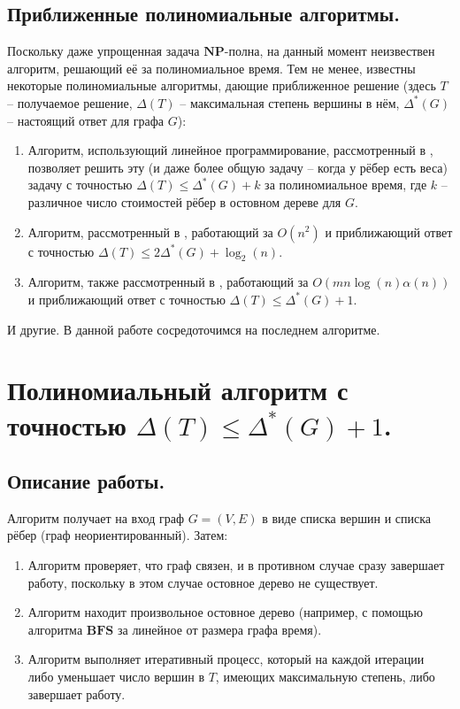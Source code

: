 \documentclass[a4paper,11pt]{article}
\renewcommand{\le}{\ensuremath{\leqslant}}
\theoremstyle{plain}
\theoremstyle{definition}
\theoremstyle{remark}
\begin{document}
\subsection{Приближенные полиномиальные алгоритмы.}

Поскольку даже упрощенная задача $\mathbf{NP}$-полна, на данный момент неизвествен алгоритм, решающий её за полиномиальное время. Тем не менее, известны некоторые полиномиальные алгоритмы, дающие приближенное решение (здесь $T$ -- получаемое решение, $\Delta(T)$ -- максимальная степень вершины в нём, $\Delta^*(G)$ -- настоящий ответ для графа $G$):

\begin{enumerate}
  \item Алгоритм, использующий линейное программирование, рассмотренный в \cite{ref1}, позволяет решить эту (и даже более общую задачу -- когда у рёбер есть веса) задачу с точностью $\Delta(T) \le \Delta^*(G) + k$ за полиномиальное время, где $k$ -- различное число стоимостей рёбер в остовном дереве для $G$.
  \item Алгоритм, рассмотренный в \cite{ref2}, работающий за $O(n^2)$ и приближающий ответ с точностью $\Delta(T) \le 2  \Delta^*(G) + \log_2 (n)$.
  \item Алгоритм, также рассмотренный в \cite{ref2}, работающий за $O(mn\log (n) \alpha(n))$ и приближающий ответ с точностью $\Delta(T) \le \Delta^*(G) + 1$.

\end{enumerate}

И другие. В данной работе сосредоточимся на последнем алгоритме.

\section{Полиномиальный алгоритм с точностью $\Delta(T) \le \Delta^*(G) + 1$.}

\subsection{Описание работы.}

Алгоритм получает на вход граф $G = (V, E)$ в виде списка вершин и списка рёбер (граф неориентированный). Затем:

\begin{enumerate}
  \item Алгоритм проверяет, что граф связен, и в противном случае сразу завершает работу, поскольку в этом случае остовное дерево не существует.
  \item Алгоритм находит произвольное остовное дерево (например, с помощью алгоритма $\mathbf{BFS}$ за линейное от размера графа время).
  \item Алгоритм выполняет итеративный процесс, который на каждой итерации либо уменьшает число вершин в $T$, имеющих максимальную степень, либо завершает работу.
\end{enumerate}
\end{document}
